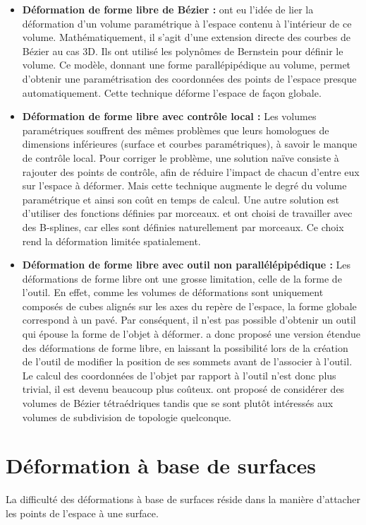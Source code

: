 \begin{itemize}
\item{\textbf{Déformation de forme libre de Bézier :}} \cite{SP86} ont
  eu l'idée de lier la déformation d'un volume paramétrique à l'espace
  contenu à l'intérieur de ce volume. Mathématiquement, il s'agit
  d'une extension directe des courbes de Bézier au cas 3D. Ils ont
  utilisé les polynômes de Bernstein pour définir le volume. Ce
  modèle, donnant une forme parallépipédique au volume, permet
  d'obtenir une paramétrisation des coordonnées des points de l'espace
  presque automatiquement. Cette technique déforme l'espace de façon
  globale.
\item{\textbf{Déformation de forme libre avec contrôle local :}} Les
  volumes paramétriques souffrent des mêmes problèmes que leurs
  homologues de dimensions inférieures (surface et courbes
  paramétriques), à savoir le manque de contrôle local. Pour corriger
  le problème, une solution naïve consiste à rajouter des points de
  contrôle, afin de réduire l'impact de chacun d'entre eux sur
  l'espace à déformer. Mais cette technique augmente le degré du
  volume paramétrique et ainsi son coût en temps de calcul. Une autre
  solution est d'utiliser des fonctions définies par
  morceaux. \cite{GP89} et \cite{Com89} ont choisi de travailler avec
  des B-splines, car elles sont définies naturellement par
  morceaux. Ce choix rend la déformation limitée spatialement.
\item{\textbf{Déformation de forme libre avec outil non
      parallélépipédique :}} Les déformations de forme libre ont une
  grosse limitation, celle de la forme de l'outil. En effet, comme les
  volumes de déformations sont uniquement composés de cubes alignés
  sur les axes du repère de l'espace, la forme globale correspond à un
  pavé. Par conséquent, il n'est pas possible d'obtenir un outil qui
  épouse la forme de l'objet à déformer. \cite{Coq90} a donc proposé
  une version étendue des déformations de forme libre, en laissant la
  possibilité lors de la création de l'outil de modifier la position
  de ses sommets avant de l'associer à l'outil. Le calcul des
  coordonnées de l'objet par rapport à l'outil n'est donc plus
  trivial, il est devenu beaucoup plus coûteux. \cite{BBT97} ont
  proposé de considérer des volumes de Bézier tétraédriques tandis que
  \cite{MJ96} se sont plutôt intéressés aux volumes de subdivision de
  topologie quelconque.
\end{itemize}

\section{Déformation à base de surfaces}
La difficulté des déformations à base de surfaces réside dans la
manière d'attacher les points de l'espace à une surface.

